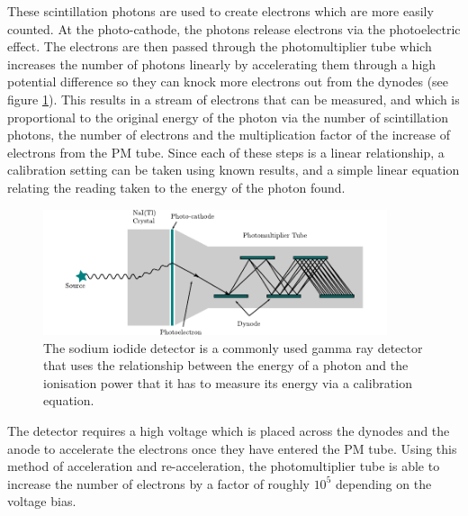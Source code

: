 These scintillation photons are used to create electrons which are more easily counted. At the photo-cathode, the photons release electrons via the photoelectric effect. The electrons are then passed through the photomultiplier tube which increases the number of photons linearly by accelerating them through a high potential difference so they can knock more electrons out from the dynodes (see figure \ref{fig:naidetctor}). This results in a stream of electrons that can be measured, and which is proportional to the original energy of the photon via the number of scintillation photons, the number of electrons and the multiplication factor of the increase of electrons from the PM tube. Since each of these steps is a linear relationship, a calibration setting can be taken using known results, and a simple linear equation relating the reading taken to the energy of the photon found.
\begin{figure}[ht]
	\centering
	\includegraphics[width=0.9\textwidth]{NaIdetector.pdf}
	\caption{The sodium iodide detector is a commonly used gamma ray detector that uses the relationship between the energy of a photon and the ionisation power that it has to measure its energy via a calibration equation.\label{fig:naidetctor}}
\end{figure}

The detector requires a high voltage which is placed across the dynodes and the anode to accelerate the electrons once they have entered the PM tube. Using this method of acceleration and re-acceleration, the photomultiplier tube is able to increase the number of electrons by a factor of roughly $10^5$ depending on the voltage bias.
\begin{figure}[ht]
	\centering
\end{figure}

